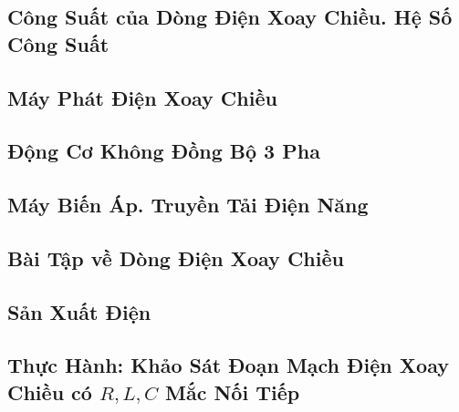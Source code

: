 \documentclass{article}
\numberwithin{equation}{section}
\begin{document}

\subsection{Công Suất của Dòng Điện Xoay Chiều. Hệ Số Công Suất}


\subsection{Máy Phát Điện Xoay Chiều}


\subsection{Động Cơ Không Đồng Bộ 3 Pha}


\subsection{Máy Biến Áp. Truyền Tải Điện Năng}


\subsection{Bài Tập về Dòng Điện Xoay Chiều}


\subsection{Sản Xuất Điện}


\subsection{Thực Hành: Khảo Sát Đoạn Mạch Điện Xoay Chiều có $R,L,C$ Mắc Nối Tiếp}
\end{document}
